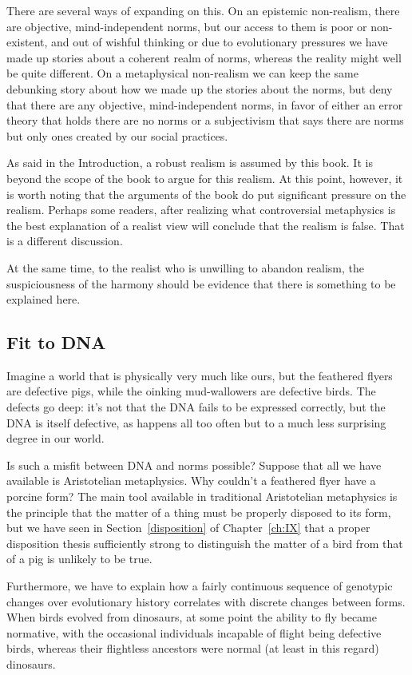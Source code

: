 There are several ways of expanding on this. On an epistemic non-realism, there are objective, mind-independent norms, but 
our access to them is poor or non-existent, and out of wishful thinking or due to evolutionary pressures we have made 
up stories about a coherent realm of norms, whereas the reality might well be quite different. On a metaphysical non-realism 
we can keep the same debunking story about how we made up the stories about the norms, but deny that there are any 
objective, mind-independent norms, in favor of either an error theory that holds there are no norms or a subjectivism
that says there are norms but only ones created by our social practices. 

As said in the Introduction, a robust realism is assumed by this book. It is beyond the scope of the book to argue for 
this realism. At this point, however, it is worth noting that the arguments of the book do put significant pressure 
on the realism. Perhaps some readers, after realizing what controversial metaphysics is the best explanation of a realist
view will conclude that the realism is false. That is a different discussion.

At the same time, to the realist who is unwilling to abandon realism, the suspiciousness of the harmony should be 
evidence that there is something to be explained here. 

\subsection{Fit to DNA}
Imagine a world that is physically very much like ours, but the feathered flyers are defective
pigs, while the oinking mud-wallowers are defective birds. The defects go deep: it's not that the DNA fails
to be expressed correctly, but the DNA is itself defective, as happens all too often but to a much less
surprising degree in our world.

Is such a misfit between DNA and norms possible? Suppose that all we have available is Aristotelian metaphysics.
Why couldn't a feathered flyer have a porcine form? The main tool available in traditional Aristotelian metaphysics
is the principle that the matter of a thing must be properly disposed to its form, but we have seen in Section~\ref{disposition}
of Chapter~\ref{ch:IX} that a proper disposition thesis sufficiently strong to distinguish the matter of a bird from 
that of a pig is unlikely to be true. 

Furthermore, we have to explain how a fairly continuous sequence of genotypic changes over evolutionary history 
correlates with discrete changes between forms. When birds evolved from dinosaurs, at some point the ability to 
fly became normative, with the occasional individuals incapable of flight being defective birds, whereas their flightless 
ancestors were normal (at least in this regard) dinosaurs. 

